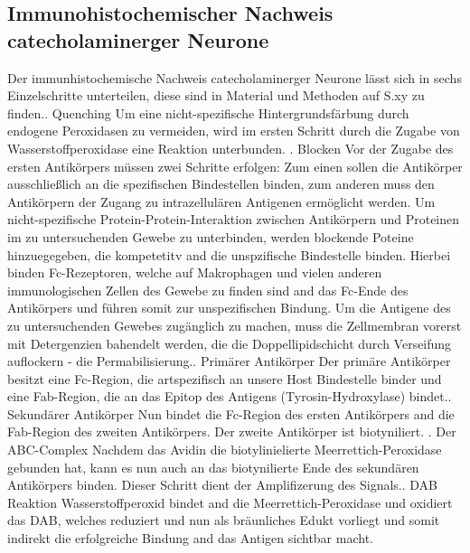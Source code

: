 \documentclass[12pt,a4paper,pdftex]{article}
\begin{document}
\subsection{Immunohistochemischer Nachweis catecholaminerger Neurone}
Der immunhistochemische Nachweis catecholaminerger Neurone lässt sich in sechs Einzelschritte unterteilen, diese sind in Material und Methoden auf S.xy zu finden.. Quenching\newline
Um eine nicht-spezifische Hintergrundsfärbung durch endogene Peroxidasen zu vermeiden, wird im ersten Schritt durch die Zugabe von Wasserstoffperoxidase eine Reaktion unterbunden. . Blocken\newline
Vor der Zugabe des ersten Antikörpers müssen zwei Schritte erfolgen: Zum einen sollen die Antikörper ausschließlich an die spezifischen Bindestellen binden, zum anderen muss den Antikörpern der Zugang zu intrazellulären Antigenen ermöglicht werden.
Um nicht-spezifische Protein-Protein-Interaktion zwischen Antikörpern und Proteinen im zu untersuchenden Gewebe zu unterbinden, werden blockende Poteine hinzuegegeben, die kompetetitv and die unspzifische Bindestelle binden. Hierbei binden Fc-Rezeptoren, welche auf Makrophagen und vielen anderen immunologischen Zellen des Gewebe zu finden sind and das Fc-Ende des Antikörpers und führen somit zur unspezifischen Bindung. 
Um die Antigene des zu untersuchenden Gewebes zugänglich zu machen, muss die Zellmembran vorerst mit Detergenzien bahendelt werden, die die Doppellipidschicht durch Verseifung auflockern - die Permabilisierung.. Primärer Antikörper\newline
Der primäre Antikörper besitzt eine Fc-Region, die artspezifisch an unsere Host Bindestelle binder und eine Fab-Region, die an das Epitop des Antigens (Tyrosin-Hydroxylase) bindet.. Sekundärer Antikörper\newline
Nun bindet die Fc-Region des ersten Antikörpers and die Fab-Region des zweiten Antikörpers. Der zweite Antikörper ist biotyniliert. . Der ABC-Complex\newline
Nachdem das Avidin die biotylinielierte Meerrettich-Peroxidase gebunden hat, kann es nun auch an das biotynilierte Ende des sekundären Antikörpers binden. Dieser Schritt dient der Amplifizerung des Signals.. DAB Reaktion\newline
Wasserstoffperoxid bindet and die Meerrettich-Peroxidase und oxidiert das DAB, welches reduziert und nun als bräunliches Edukt vorliegt und somit indirekt die erfolgreiche Bindung and das Antigen sichtbar macht.\newline
\end{document}
